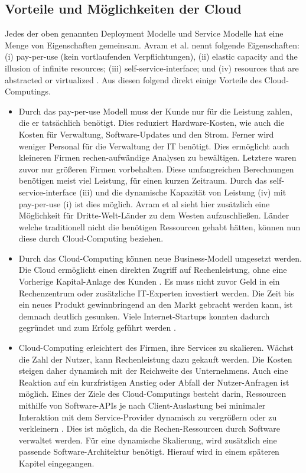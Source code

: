 \subsection{Vorteile und Möglichkeiten der Cloud}
Jedes der oben genannten Deployment Modelle und Service Modelle hat eine Menge von Eigenschaften gemeinsam. Avram et al. nennt folgende Eigenschaften: (i) pay-per-use (kein vortlaufenden Verpflichtungen), (ii) elastic capacity and the illusion of infinite resources; (iii) self-service-interface; und (iv) resources that are abstracted or virtualized \cite{avram_advantages_2014}. Aus diesen folgend direkt einige Vorteile des Cloud-Computings.
\begin{itemize}
  \item Durch das pay-per-use Modell muss der Kunde nur für die Leistung zahlen, die er tatsächlich benötigt. Dies reduziert Hardware-Kosten, wie auch die Kosten für Verwaltung, Software-Updates und den Strom. Ferner wird weniger Personal für die Verwaltung der IT benötigt. Dies ermöglicht auch kleineren Firmen rechen-aufwändige Analysen zu bewältigen. Letztere waren zuvor nur größeren Firmen vorbehalten. Diese umfangreichen Berechnungen benötigen meist viel Leistung, für einen kurzen Zeitraum. Durch das self-service-interface (iii) und die dynamische Kapazität von Leistung (iv) mit pay-per-use (i) ist dies möglich. Avram et al \cite{avram_advantages_2014} sieht hier zusätzlich eine Möglichkeit für Dritte-Welt-Länder zu dem Westen aufzuschließen. Länder welche traditionell nicht die benötigen Ressourcen gehabt hätten, können nun diese durch Cloud-Computing beziehen.  
  \item Durch das Cloud-Computing können neue Business-Modell umgesetzt werden. Die Cloud ermöglicht einen direkten Zugriff auf Rechenleistung, ohne eine Vorherige Kapital-Anlage des Kunden \cite{noauthor_premise_2020}. Es muss nicht zuvor Geld in ein Rechenzentrum oder zusätzliche IT-Experten investiert werden. Die Zeit bis ein neues Produkt gewinnbringend an den Markt gebracht werden kann, ist demnach deutlich gesunken. Viele Internet-Startups konnten dadurch gegründet und zum Erfolg geführt werden \cite{avram_advantages_2014}. 
  \item Cloud-Computing erleichtert des Firmen, ihre Services zu skalieren. Wächst die Zahl der Nutzer, kann Rechenleistung dazu gekauft werden. Die Kosten steigen daher dynamisch mit der Reichweite des Unternehmens. Auch eine Reaktion auf ein kurzfristigen Anstieg oder Abfall der Nutzer-Anfragen ist möglich. Eines der Ziele des Cloud-Computings besteht darin, Ressourcen mithilfe von Software-APIs je nach Client-Auslastung bei minimaler Interaktion mit dem Service-Provider dynamisch zu vergrößern oder zu verkleinern \cite{avram_advantages_2014}. Dies ist möglich, da die Rechen-Ressourcen durch Software verwaltet werden. Für eine dynamische Skalierung, wird zusätzlich eine passende Software-Architektur benötigt. Hierauf wird in einem späteren Kapitel eingegangen.

\end{itemize}
